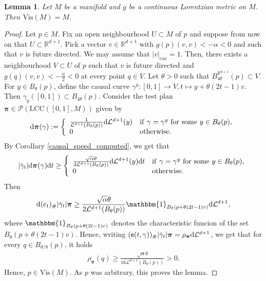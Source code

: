 \documentclass[a4paper,10pt]{article}
\newtheorem{lemma}[theorem]{Lemma}
\numberwithin{equation}{section}
\newcommand{\R}{\mathbb{R}}
\newcommand{\di}{{\rm d}}
\begin{document}
\begin{lemma}\label{visibility}
    Let $M$ be a manifold and $g$ be a continuous Lorentzian metric on $M$. Then $\mathrm{Vis}(M) =M$. 
\end{lemma}
\begin{proof}
    Let $p \in M$. Fix an open neighbourhood $U \subset M$ of $p$ and suppose from now on that $U \subset \R^{d+1}$. Pick a vector $v \in \R^{d+1}$ with $g(p)(v,v)<-\alpha<0$ and such that $v$ is future directed. We may assume that $|v|_{euc}=1$.  
    Then, there exists a neighbourhood $V \subset U$ of $p$ such that $v$ is future directed and $g(q)(v,v)<-\frac{\alpha}{2}<0$ at every point $q \in V$. Let $\theta >0$ such that $B_{4\theta}^{\R^{d+1}}(p) \subset V$. 
    For $y \in B_\theta(p)$, define the causal curve \mbox{$\gamma^y\colon [0,1] \to V, t \mapsto y+\theta(2t-1)v$}. Then $\gamma_y([0,1]) \subset B_{4\theta}(p)$.
    Consider the test plan $\boldsymbol{\pi} \in \mathcal{P}(\mathrm{LCC}([0,1], M))$ given by  
    \begin{align*}
        \di \boldsymbol{\pi}(\gamma):= \left\{ \begin{array}{ll}
            \frac{1}{\mathcal{L}^{d+1}(B_\theta(p))}\di \mathcal{L}^{d+1}(y)  & \mathrm{if}\ \gamma=\gamma^y \ \mathrm{for\ some\ } y \in B_\theta(p), \\
            0 & \mathrm{otherwise.}
        \end{array} \right.
    \end{align*}
   By Corollary \ref{causal_speed_computed}, we get that
     \begin{align*}
        |\dot{\gamma}_t|\di \boldsymbol{\pi}(\gamma)\di t\geq  \left\{ \begin{array}{ll}
            \frac{\sqrt{\alpha}\theta}{2\mathcal{L}^{d+1}(B_\theta(p))}\di \mathcal{L}^{d+1}(y)\di t  & \mathrm{if}\ \gamma=\gamma^y \ \mathrm{for\ some\ } y \in B_\theta(p), \\
            0 & \mathrm{otherwise.}
        \end{array} \right.
    \end{align*}
    Then 
    \begin{align*}
        \di (e_t)_\#|\dot{\gamma}_t|\boldsymbol{\pi} \geq  \frac{\sqrt{\alpha}\theta}{2\mathcal{L}^{d+1}(B_\theta(p))} \mathbbm{1}_{B_\theta(p+\theta(2t-1)v)} \di \mathcal{L}^{d+1},
    \end{align*}
    where $\mathbbm{1}_{B_\theta(p+\theta(2t-1)v)}$ denotes the characteristic funcion of the set $B_\theta(p+\theta(2t-1)v)$.
    Hence, writing $(\mathsf{e}(t, \gamma))_\#|\dot{\gamma}_t|\boldsymbol{\pi}= \rho_{\boldsymbol{\pi}}\di \mathcal{L}^{d+1}$, we get that for every $q \in B_{\theta/8}(p)$, it holds
    \begin{align*}
        \rho_{\boldsymbol{\pi}}(q) \geq \frac{\sqrt{\alpha}\theta}{16\mathcal{L}^{d+1}(B_\theta(p))} >0.
    \end{align*}
    Hence, $p \in \mathrm{Vis}(M)$. As $p$ was arbitrary, this proves the lemma. 
\end{proof}
\end{document}
